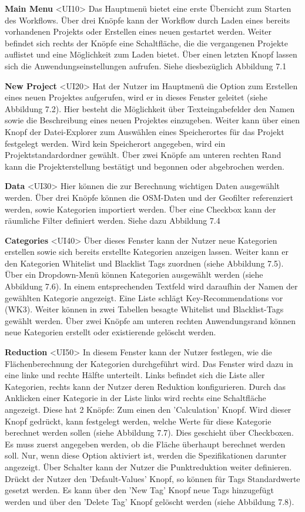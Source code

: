 \documentclass[parskip=full]{scrartcl} %
\begin{document}
\textbf{Main Menu }<UI10>
Das Hauptmenü bietet eine erste Übersicht zum Starten des Workflows. Über drei Knöpfe kann der Workflow durch Laden eines bereits vorhandenen Projekts oder Erstellen eines neuen gestartet werden. Weiter befindet sich rechts der Knöpfe eine Schaltfläche, die die vergangenen Projekte auflistet und eine Möglichkeit zum Laden bietet. Über einen letzten Knopf lassen sich die Anwendungseinstellungen aufrufen. Siehe diesbezüglich Abbildung 7.1

\textbf{New Project }<UI20>
Hat der Nutzer im Hauptmenü die Option zum Erstellen eines neuen Projektes aufgerufen, wird er in dieses Fenster geleitet (siehe Abbildung 7.2).
Hier besteht die Möglichkeit über Texteingabefelder den Namen sowie die Beschreibung eines neuen Projektes einzugeben. Weiter kann über einen Knopf der Datei-Explorer zum Auswählen eines Speicherortes für das Projekt festgelegt werden. Wird kein Speicherort angegeben, wird ein Projektstandardordner gewählt.
Über zwei Knöpfe am unteren rechten Rand kann die Projekterstellung bestätigt und begonnen oder abgebrochen werden.

\textbf{Data }<UI30>
Hier können die zur Berechnung wichtigen Daten ausgewählt werden.
Über drei Knöpfe können die OSM-Daten und der Geofilter referenziert werden, sowie Kategorien importiert werden. Über eine Checkbox kann der räumliche Filter definiert werden. Siehe dazu Abbildung 7.4 

\textbf{Categories }<UI40>
Über dieses Fenster kann der Nutzer neue Kategorien erstellen sowie sich bereits erstellte Kategorien anzeigen lassen. Weiter kann er den Kategorien Whitelist und Blacklist Tags zuordnen (siehe Abbildung 7.5).
Über ein Dropdown-Menü können Kategorien ausgewählt werden (siehe Abbildung 7.6). In einem entsprechenden Textfeld wird daraufhin der Namen der gewählten Kategorie angezeigt. Eine Liste schlägt Key-Recommendations vor (WK3). Weiter können in zwei Tabellen besagte Whitelist und Blacklist-Tags gewählt werden.
Über zwei Knöpfe am unteren rechten Anwendungsrand können neue Kategorien erstellt oder existierende gelöscht werden. 

\newpage
\textbf{Reduction }<UI50>
In diesem Fenster kann der Nutzer festlegen, wie die Flächenberechnung der Kategorien durchgeführt wird. Das Fenster wird dazu in eine linke und rechte Hälfte unterteilt.
Links befindet sich die Liste aller Kategorien, rechts kann der Nutzer deren Reduktion konfigurieren.
Durch das Anklicken einer Kategorie in der Liste links wird rechts eine Schaltfläche angezeigt. Diese hat 2 Knöpfe: Zum einen den 'Calculation' Knopf. Wird dieser Knopf gedrückt, kann festgelegt werden, welche Werte für diese Kategorie berechnet werden sollen (siehe Abbildung 7.7). Dies geschieht über Checkboxen. Es muss zuerst angegeben werden, ob die Fläche überhaupt berechnet werden soll. Nur, wenn diese Option aktiviert ist, werden die Spezifikationen darunter angezeigt. Über Schalter kann der Nutzer die Punktreduktion weiter definieren.
Drückt der Nutzer den 'Default-Values' Knopf, so können für Tags Standardwerte gesetzt werden. Es kann über den 'New Tag' Knopf neue Tags hinzugefügt werden und über den 'Delete Tag' Knopf gelöscht werden (siehe Abbildung 7.8).
\end{document}
